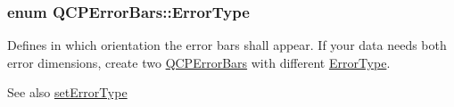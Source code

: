 \subsubsection[{\texorpdfstring{Error\+Type}{ErrorType}}]{\setlength{\rightskip}{0pt plus 5cm}enum {\bf Q\+C\+P\+Error\+Bars\+::\+Error\+Type}}\hypertarget{class_q_c_p_error_bars_a95f0220f11a72648b96480a85ce26474}{}\label{class_q_c_p_error_bars_a95f0220f11a72648b96480a85ce26474}
Defines in which orientation the error bars shall appear. If your data needs both error dimensions, create two \hyperlink{class_q_c_p_error_bars}{Q\+C\+P\+Error\+Bars} with different \hyperlink{class_q_c_p_error_bars_a95f0220f11a72648b96480a85ce26474}{Error\+Type}.

\begin{DoxySeeAlso}{See also}
\hyperlink{class_q_c_p_error_bars_af0af493d454a8f3a0908830160680d2b}{set\+Error\+Type} 
\end{DoxySeeAlso}
